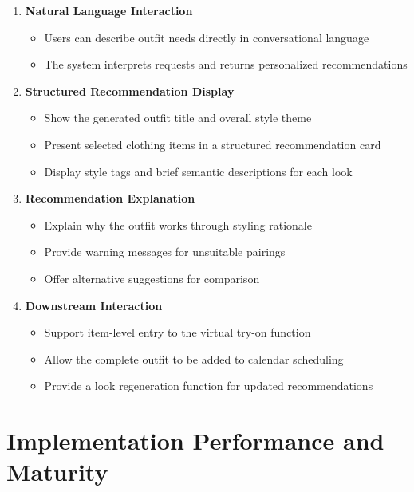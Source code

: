 \begin{enumerate}
    \item \textbf{Natural Language Interaction}
    \begin{itemize}
        \item Users can describe outfit needs directly in conversational language
        \item The system interprets requests and returns personalized recommendations
    \end{itemize}

    \item \textbf{Structured Recommendation Display}
    \begin{itemize}
        \item Show the generated outfit title and overall style theme
        \item Present selected clothing items in a structured recommendation card
        \item Display style tags and brief semantic descriptions for each look
    \end{itemize}

    \item \textbf{Recommendation Explanation}
    \begin{itemize}
        \item Explain why the outfit works through styling rationale
        \item Provide warning messages for unsuitable pairings
        \item Offer alternative suggestions for comparison
    \end{itemize}

    \item \textbf{Downstream Interaction}
    \begin{itemize}
        \item Support item-level entry to the virtual try-on function
        \item Allow the complete outfit to be added to calendar scheduling
        \item Provide a look regeneration function for updated recommendations
    \end{itemize}
\end{enumerate}

\section{Implementation  Performance and Maturity}

